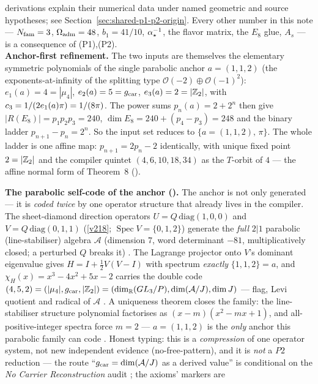 \begin{keybox}
derivations explain their numerical data under named geometric and source hypotheses; see
Section~\ref{sec:shared-p1-p2-origin}. Every other number in this note --- $N_{\mathrm{fam}}=3$, $\Omega_{\mathrm{adm}}=48$,
$b_1=41/10$, $\alpha^{-1}_\star$, the flavor matrix, the $E_8$ glue, $A_s$ --- is a consequence of (P1),(P2).
\smallskip\\
\noindent\textbf{Anchor-first refinement.} The two inputs are themselves the elementary symmetric
polynomials of the single parabolic anchor $a=(1,1,2)$ (the exponents-at-infinity of the splitting type
$\mathcal O(-2)\oplus\mathcal O(-1)^2$): $e_1(a)=4=|\mu_4|$, $e_2(a)=5=g_{\mathrm{car}}$, $e_3(a)=2=|\mathbb{Z}_2|$, with
$c_3=1/(2e_1(a)\pi)=1/(8\pi)$. The power sums $p_n(a)=2+2^n$ then give $|R(E_8)|=p_1p_2p_3=240$,
$\dim E_8=240+(p_4{-}p_3)=248$ and the binary ladder $p_{n+1}{-}p_n=2^n$. So the input set reduces to
$\{a=(1,1,2),\,\pi\}$.   The whole ladder is one affine map: $p_{n+1}=2p_n-2$
identically, with unique fixed point $2=|\mathbb{Z}_2|$ and the compiler quintet $(4,6,10,18,34)$ as the $T$-orbit
of $4$ --- the affine normal form of Theorem~8 ().
\par\smallskip\noindent\textbf{The parabolic self-code of the anchor
().} The anchor is not only
generated --- it is \emph{coded twice} by one operator structure that
already lives in the compiler.  The sheet-diamond direction operators
$U=Q\,\mathrm{diag}(1,0,0)$ and $V=Q\,\mathrm{diag}(0,1,1)$ (\vref{v218};
$\operatorname{Spec}V=\{0,1,2\}$) generate the \emph{full} $2|1$ parabolic
(line-stabiliser) algebra $\mathcal A$ (dimension $7$, word determinant
$-81$, multiplicatively closed; a perturbed $Q$ breaks it) \mE.  The
Lagrange projector onto $V$'s dominant eigenvalue gives
$H=I+\tfrac12V(V-I)$ with spectrum \emph{exactly} $\{1,1,2\}=a$, and
$\chi_H(x)=x^3-4x^2+5x-2$ carries the double code
$(4,5,2)=(|\mu_4|,g_{\mathrm{car}},|\mathbb{Z}_2|)=(\dim_{\mathbb R}(GL_3/P),\dim(\mathcal
A/J),\dim J)$ --- flag, Levi quotient and radical of $\mathcal A$ \mE.  A
uniqueness theorem closes the family: the line-stabiliser structure
polynomial factorises as $(x-m)(x^2-mx+1)$, and all-positive-integer
spectra force $m=2$ --- $a=(1,1,2)$ is the \emph{only} anchor this
parabolic family can code \mE.  Honest typing: this is a
\emph{compression} of one operator system, not new independent evidence
(no-free-pattern), and it is \emph{not} a $P2$ reduction --- the route
``$g_{\mathrm{car}}=\dim(\mathcal A/J)$ as a derived value'' is conditional on the
\emph{No Carrier Reconstruction} audit \mO; the axioms' markers are

\end{keybox}
